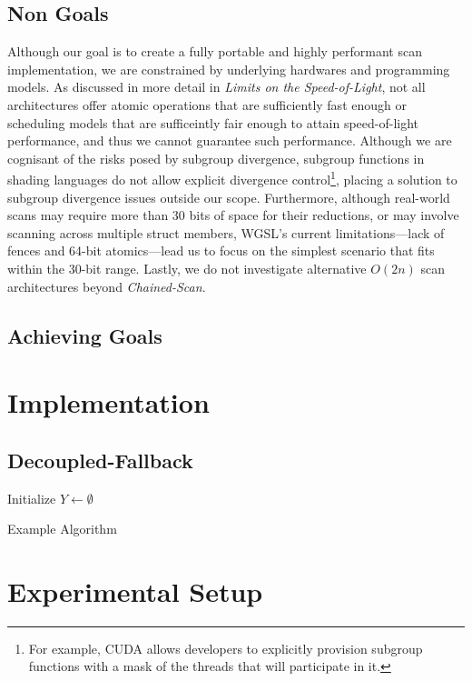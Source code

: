 \documentclass[sigconf]{acmart}
\begin{document}
\subsection{Non Goals}
Although our goal is to create a fully portable and highly performant scan implementation, we are constrained by underlying hardwares and programming models. As discussed in more detail in \emph{Limits on the Speed-of-Light}, not all architectures offer atomic operations that are sufficiently fast enough or scheduling models that are sufficeintly fair enough to attain speed-of-light performance, and thus we cannot guarantee such performance. Although we are cognisant of the risks posed by subgroup divergence, subgroup functions in shading languages do not allow explicit divergence control\footnote{For example, CUDA allows developers to explicitly provision subgroup functions with a mask of the threads that will participate in it.}, placing a solution to subgroup divergence issues outside our scope. Furthermore, although real-world scans may require more than 30 bits of space for their reductions, or may involve scanning across multiple struct members, WGSL’s current limitations---lack of fences and 64-bit atomics---lead us to focus on the simplest scenario that fits within the 30-bit range. Lastly, we do not investigate alternative $O(2n)$ scan architectures beyond \emph{Chained-Scan}.

\subsection{Achieving Goals}

\section{Implementation}

\subsection{Decoupled-Fallback}

\begin{algorithm}[htbp]
  \SetAlgoLined
  Initialize $Y \leftarrow \emptyset$\;
  \;
  \caption{Example Algorithm}
  \label{alg:example}
  \end{algorithm}
\section{Experimental Setup}
\end{document}
